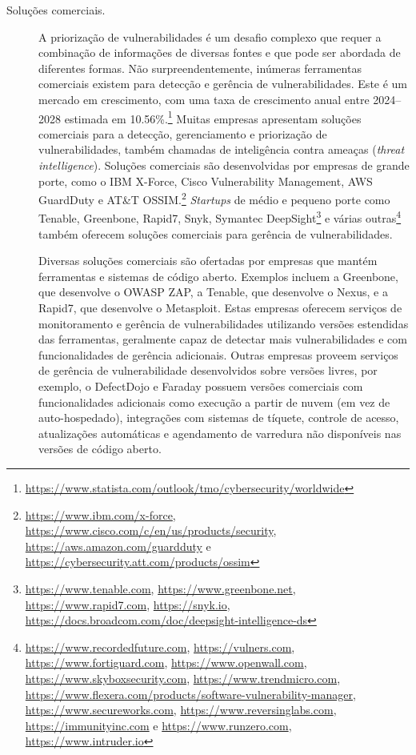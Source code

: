\begin{description}
    \item[Soluções comerciais.] A priorização de vulnerabilidades é um desafio complexo que requer a combinação de informações de diversas fontes e que pode ser abordada de diferentes formas. Não surpreendentemente, inúmeras ferramentas comerciais existem para detecção e gerência de vulnerabilidades. Este é um mercado em crescimento, com uma taxa de crescimento anual entre 2024--2028 estimada em 10.56\%.\footnote{\url{https://www.statista.com/outlook/tmo/cybersecurity/worldwide}} Muitas empresas apresentam soluções comerciais para a detecção, gerenciamento e priorização de vulnerabilidades, também chamadas de inteligência contra ameaças (\emph{threat intelligence}).
    Soluções comerciais são desenvolvidas por empresas de grande porte, como o IBM X-Force, Cisco Vulnerability Management, AWS GuardDuty e AT\&T OSSIM.\footnote{\url{https://www.ibm.com/x-force}, \url{https://www.cisco.com/c/en/us/products/security}, \url{https://aws.amazon.com/guardduty} e \url{https://cybersecurity.att.com/products/ossim}}
    \emph{Startups} de médio e pequeno porte como Tenable, Greenbone, Rapid7, Snyk, Symantec DeepSight\footnote{\url{https://www.tenable.com}, \url{https://www.greenbone.net}, \url{https://www.rapid7.com}, \url{https://snyk.io}, \url{https://docs.broadcom.com/doc/deepsight-intelligence-ds}} e várias outras\footnote{\url{https://www.recordedfuture.com}, \url{https://vulners.com}, \url{https://www.fortiguard.com}, \url{https://www.openwall.com}, \url{https://www.skyboxsecurity.com}, \url{https://www.trendmicro.com}, \url{https://www.flexera.com/products/software-vulnerability-manager}, \url{https://www.secureworks.com}, \url{https://www.reversinglabs.com}, \url{https://immunityinc.com} e \url{https://www.runzero.com}, \url{https://www.intruder.io}} também oferecem soluções comerciais para gerência de vulnerabilidades.

    Diversas soluções comerciais são ofertadas por empresas que mantém ferramentas e sistemas de código aberto. Exemplos incluem a Greenbone, que desenvolve o OWASP ZAP, a Tenable, que desenvolve o Nexus, e a Rapid7, que desenvolve o Metasploit. Estas empresas oferecem serviços de monitoramento e gerência de vulnerabilidades utilizando versões estendidas das ferramentas, geralmente capaz de detectar mais vulnerabilidades e com funcionalidades de gerência adicionais. Outras empresas proveem serviços de gerência de vulnerabilidade desenvolvidos sobre versões livres, por exemplo, o DefectDojo e Faraday possuem versões comerciais com funcionalidades adicionais como execução a partir de nuvem (em vez de auto-hospedado), integrações com sistemas de tíquete, controle de acesso, atualizações automáticas e agendamento de varredura não disponíveis nas versões de código aberto.

\end{description}

